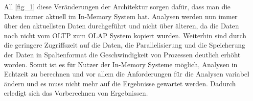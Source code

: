 All \ref{fig_1} diese Veränderungen der Architektur sorgen dafür, dass man die Daten immer 
aktuell im In-Memory System hat. Analysen werden nun immer über 
den aktuellsten Daten durchgeführt und nicht über älteren, da die Daten noch nicht vom OLTP zum OLAP System kopiert wurden. Weiterhin sind durch die geringere Zugriffszeit auf die Daten, die Parallelisierung und die Speicherung der Daten in Spaltenformat die Geschwindigkeit von Prozessen deutlich erhöht worden. Somit ist es für Nutzer der In-Memory Systeme möglich, Analysen in Echtzeit zu berechnen und vor allem die Anforderungen für die Analysen variabel ändern und es muss nicht mehr auf die Ergebnisse gewartet werden. Dadurch erledigt sich das Vorberechnen von Ergebnissen.\cite{neumannsap}
\\
